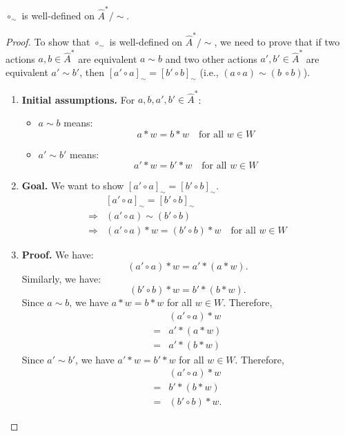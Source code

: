 \begin{proposition}\label{prp:circ_sim_well_defined}
    $\circ_{\sim}$ is well-defined on $\hat{A}^{\ast}/\sim$.
\end{proposition}
\begin{proof}
    To show that $\circ_{\sim}$ is well-defined on $\hat{A}^{\ast}/\sim$, we need to prove that if two actions $a,b \in \hat{A}^{\ast}$ are equivalent $a \sim b$ and two other actions $a', b' \in \hat{A}^{\ast}$ are equivalent $a' \sim b'$, then $[a' \circ a]_{\sim} = [b' \circ b]_{\sim}$ (i.e., $(a \circ a) \sim (b\ \circ b)$).

    \begin{enumerate}[(1)]
    \item \textbf{Initial assumptions.}
    For $a, b, a', b' \in \hat{A}^{\ast}$:
    \begin{itemize}
        \item $a \sim b$ means:
        \begin{equation}
            a \ast w = b \ast w \quad \text{for all } w\in W
        \end{equation}
        \item $a' \sim b'$ means:
        \begin{equation}
            a' \ast w = b' \ast w \quad \text{for all } w\in W
        \end{equation}
    \end{itemize}

    \item \textbf{Goal.}
    We want to show $[a' \circ a]_{\sim} = [b' \circ b]_{\sim}$.
    \begin{align}
        &[a' \circ a]_{\sim} = [b' \circ b]_{\sim} \\
        \Rightarrow{} &(a' \circ a) \sim (b' \circ b) \\
        \Rightarrow{} &(a' \circ a) \ast w = (b' \circ b) \ast w \quad \text{for all } w \in W
    \end{align}

    \item \textbf{Proof.}
    We have:
    \begin{equation}
        (a' \circ a) \ast w = a' \ast (a \ast w).
    \end{equation}
    Similarly, we have:
    \begin{equation}
        (b' \circ b) \ast w = b' \ast (b \ast w).
    \end{equation}
    Since $a \sim b$, we have $a \ast w = b \ast w$ for all $w \in W$.
    Therefore,
    \begin{align}
        &(a' \circ a) \ast w \\
        ={}& a' \ast (a \ast w) \\
        ={}& a' \ast (b \ast w)
    \end{align}
    Since $a' \sim b'$, we have $a' \ast w = b' \ast w$ for all $w \in W$.
    Therefore,
    \begin{align}
        &(a' \circ a) \ast w \\
        ={}& b' \ast (b \ast w) \\
        ={}& (b' \circ b) \ast w.
    \end{align}



\end{enumerate}
\end{proof}
